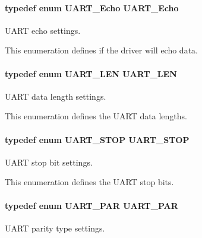 \paragraph[{U\+A\+R\+T\+\_\+\+Echo}]{\setlength{\rightskip}{0pt plus 5cm}typedef enum {\bf U\+A\+R\+T\+\_\+\+Echo}  {\bf U\+A\+R\+T\+\_\+\+Echo}}\label{_u_a_r_t_8h_a5372f2a3d7f68aa38ea560ed5fe520a9}


U\+A\+R\+T echo settings. 

This enumeration defines if the driver will echo data. 
\paragraph[{U\+A\+R\+T\+\_\+\+L\+E\+N}]{\setlength{\rightskip}{0pt plus 5cm}typedef enum {\bf U\+A\+R\+T\+\_\+\+L\+E\+N}  {\bf U\+A\+R\+T\+\_\+\+L\+E\+N}}\label{_u_a_r_t_8h_a9290f6d71215e218998106ddff83911b}


U\+A\+R\+T data length settings. 

This enumeration defines the U\+A\+R\+T data lengths. 
\paragraph[{U\+A\+R\+T\+\_\+\+S\+T\+O\+P}]{\setlength{\rightskip}{0pt plus 5cm}typedef enum {\bf U\+A\+R\+T\+\_\+\+S\+T\+O\+P}  {\bf U\+A\+R\+T\+\_\+\+S\+T\+O\+P}}\label{_u_a_r_t_8h_a7f2ba2e85c63055e158e5e4b51b1f9fd}


U\+A\+R\+T stop bit settings. 

This enumeration defines the U\+A\+R\+T stop bits. 
\paragraph[{U\+A\+R\+T\+\_\+\+P\+A\+R}]{\setlength{\rightskip}{0pt plus 5cm}typedef enum {\bf U\+A\+R\+T\+\_\+\+P\+A\+R}  {\bf U\+A\+R\+T\+\_\+\+P\+A\+R}}\label{_u_a_r_t_8h_a12584e934e85933c6b20b59b0ac5c343}


U\+A\+R\+T parity type settings. 

